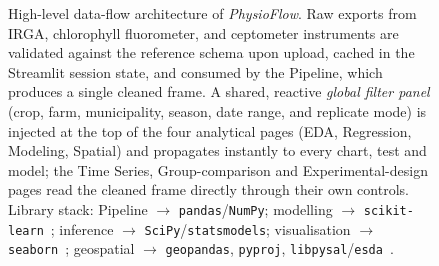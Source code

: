 \documentclass[preprint,12pt,a4paper]{elsarticle}
\begin{document}
\begin{figure}[!htb]
{%
}
\caption{High-level data-flow architecture of \emph{PhysioFlow}. Raw exports from IRGA, chlorophyll fluorometer, and ceptometer instruments are validated against the reference schema upon upload, cached in the Streamlit session state, and consumed by the Pipeline, which produces a single cleaned frame. A shared, reactive \emph{global filter panel} (crop, farm, municipality, season, date range, and replicate mode) is injected at the top of the four analytical pages (EDA, Regression, Modeling, Spatial) and propagates instantly to every chart, test and model; the Time Series, Group-comparison and Experimental-design pages read the cleaned frame directly through their own controls. Library stack: Pipeline $\to$ \texttt{pandas}/\texttt{NumPy}; modelling $\to$ \texttt{scikit-learn}~\cite{Pedregosa2011}; inference $\to$ \texttt{SciPy}/\texttt{statsmodels}; visualisation $\to$ \texttt{seaborn}~\cite{Waskom2021,Hunter2007}; geospatial $\to$ \texttt{geopandas}, \texttt{pyproj}, \texttt{libpysal}/\texttt{esda}~\cite{Rey2010Pysal}.}\label{fig:architecture}
\end{figure}
\end{document}

